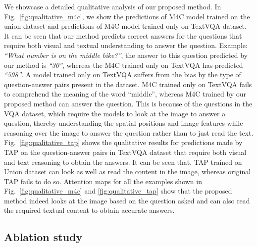 \documentclass[10pt,twocolumn,letterpaper]{article}
\begin{document}
We showcase a detailed qualitative analysis of our proposed method. In Fig.~\ref{fig:qualitative_m4c}, we show the predictions of M4C model trained on the union dataset and predictions of M4C model trained only on TextVQA dataset. It can be seen that our method predicts correct answers for the questions that require both visual and textual understanding to answer the question. Example: \textit{``What number is on the middle bike?''}, the answer to this question predicted by our method is \textit{``30''}, whereas the M4C trained only on TextVQA has predicted \textit{``598''}. A model trained only on TextVQA suffers from the bias by the type of question-answer pairs present in the dataset. M4C trained only on TextVQA fails to comprehend the meaning of the word ``middle'', whereas M4C trained by our proposed method can answer the question. This is because of the questions in the VQA dataset, which require the models to look at the image to answer a question, thereby understanding the spatial positions and image features while reasoning over the image to answer the question rather than to just read the text. Fig.~\ref{fig:qualitative_tap} shows the qualitative results for predictions made by TAP on the question-answer pairs in TextVQA dataset that require both visual and text reasoning to obtain the answers. It can be seen that, TAP trained on Union dataset can look as well as read the content in the image, whereas original TAP fails to do so. Attention maps for all the examples shown in Fig.~\ref{fig:qualitative_m4c} and \ref{fig:qualitative_tap} show that the proposed method indeed looks at the image based on the question asked and can also read the required textual content to obtain accurate answers. 

\subsection{Ablation study}
\label{subsec:ablation}
\end{document}
